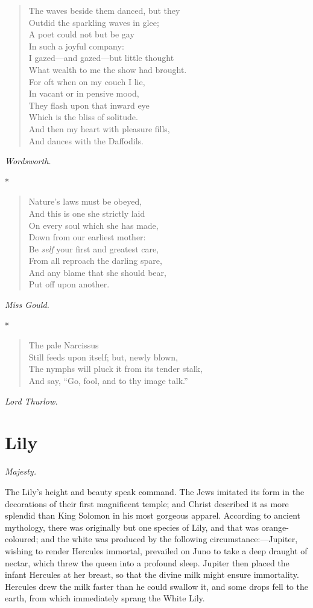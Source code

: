 \documentclass[11pt,twoside]{article}
\newcommand\flower[2]{\section*{#1}\addcontentsline{toc}{section}{#1}%
  \noindent\textit{#2.}\par\medskip}
\newcommand\stars{\begin{center}*\quad*\quad*\end{center}}
\newcommand\by[1]{\par\hfill\textit{#1}\par}
\begin{document}
\begin{verse}
The waves beside them danced, but they\\
\quad Outdid the sparkling waves in glee;\\
A poet could not but be gay\\
\quad In such a joyful company:\\
I gazed---and gazed---but little thought\\
What wealth to me the show had brought.\\
For oft when on my couch I lie,\\
\quad In vacant or in pensive mood,\\
They flash upon that inward eye\\
\quad Which is the bliss of solitude.\\
And then my heart with pleasure fills,\\
And dances with the Daffodils.
\end{verse}

\by{Wordsworth.}

\stars

\begin{verse}
Nature’s laws must be obeyed,\\
And this is one she strictly laid\\
On every soul which she has made,\\
\quad Down from our earliest mother:\\
Be \emph{self} your first and greatest care,\\
From all reproach the darling spare,\\
And any blame that she should bear,\\
\quad Put off upon another.
\end{verse}

\by{Miss Gould.}

\stars

\begin{verse}
\quad The pale Narcissus\\
Still feeds upon itself; but, newly blown,\\
The nymphs will pluck it from its tender stalk,\\
And say, “Go, fool, and to thy image talk.”
\end{verse}

\by{Lord Thurlow.}

\flower{Lily}{Majesty}

The Lily’s height and beauty speak command. The Jews imitated its form in the decorations of their first magnificent temple; and Christ described it as more splendid than King Solomon in his most gorgeous apparel. According to ancient mythology, there was originally but one species of Lily, and that was orange-coloured; and the white was produced by the following circumstance:---Jupiter, wishing to render Hercules immortal, prevailed on Juno to take a deep draught of nectar, which threw the queen into a profound sleep. Jupiter then placed the infant Hercules at her breast, so that the divine milk might ensure immortality. Hercules drew the milk faster than he could swallow it, and some drops fell to the earth, from which immediately sprang the White Lily.
\end{document}
